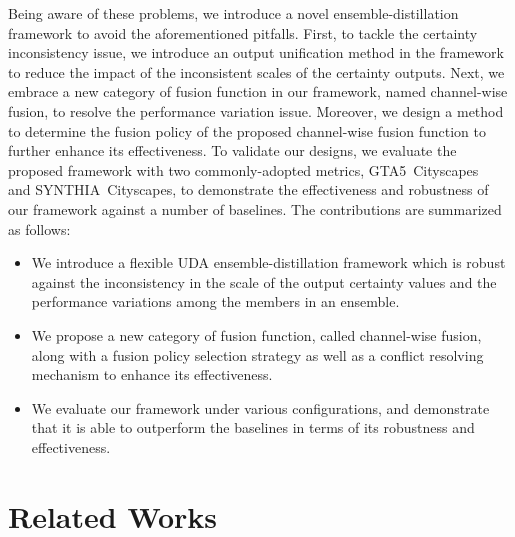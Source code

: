 \documentclass[final]{cvpr}
\begin{document}
Being aware of these problems, we introduce a novel ensemble-distillation framework to avoid the aforementioned pitfalls. First, to tackle the certainty inconsistency issue, we introduce an output unification method in the framework to reduce the impact of the inconsistent scales of the certainty outputs. Next, we embrace a new category of fusion function in our framework, named channel-wise fusion, to resolve the performance variation issue. Moreover, we design a method to determine the fusion policy of the proposed channel-wise fusion function to further enhance its effectiveness. To validate our designs, we evaluate the proposed framework with two commonly-adopted metrics, GTA5~\cite{richter2016playing}Cityscapes~\cite{Cordts2016Cityscapes} and SYNTHIA~\cite{ros2016synthia}Cityscapes, to demonstrate the effectiveness and robustness of our framework against a number of baselines. The contributions are summarized as follows:
\vspace{-0.5ex}
\begin{itemize}
\setlength\itemsep{-0.7ex}
  \item We introduce a flexible UDA ensemble-distillation framework which is robust against the inconsistency in the scale of the output certainty values and the performance variations among the members in an ensemble.
  \item We propose a new category of fusion function, called channel-wise fusion, along with a fusion policy selection strategy as well as a conflict resolving mechanism to enhance its effectiveness. \item We evaluate our framework under various configurations, and demonstrate that it is able to outperform the baselines in terms of its robustness and effectiveness.
\end{itemize}
\vspace{-0.5ex} \section{Related Works}
\label{sec:related_works}
\end{document}
